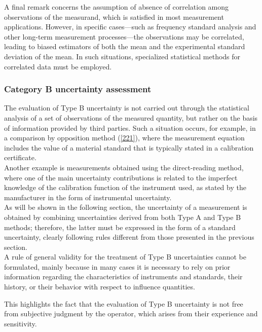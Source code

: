 \documentclass[../main.tex]{subfiles}
\begin{document}
A final remark concerns the assumption of absence of correlation among observations of the measurand, which is satisfied in most measurement applications. 
However, in specific cases—such as frequency standard analysis and other long-term measurement processes—the observations may be correlated, leading to biased estimators of both the mean and the experimental standard deviation of the mean. In such situations, specialized statistical methods for correlated data must be employed.

\subsubsection{Category B uncertainty assessment}


The evaluation of Type B uncertainty is not carried out through the statistical analysis of a set of observations of the measured quantity, but rather on the basis of information provided by third parties. 
Such a situation occurs, for example, in a comparison by opposition method (\ref{221}), where the measurement equation includes the value of a material standard that is typically stated in a calibration certificate.\\

Another example is measurements obtained using the direct-reading method, where one of the main uncertainty contributions is related to the imperfect knowledge of the calibration function of the instrument used, as stated by the manufacturer in the form of instrumental uncertainty.\\

As will be shown in the following section, the uncertainty of a measurement is obtained by combining uncertainties derived from both Type A and Type B methods; therefore, the latter must be expressed in the form of a standard uncertainty, clearly following rules different from those presented in the previous section.\\

A rule of general validity for the treatment of Type B uncertainties cannot be formulated, mainly because in many cases it is necessary to rely on prior information regarding the characteristics of instruments and standards, their history, or their behavior with respect to influence quantities. 

This highlights the fact that the evaluation of Type B uncertainty is not free from subjective judgment by the operator, which arises from their experience and sensitivity.\\
\end{document}
